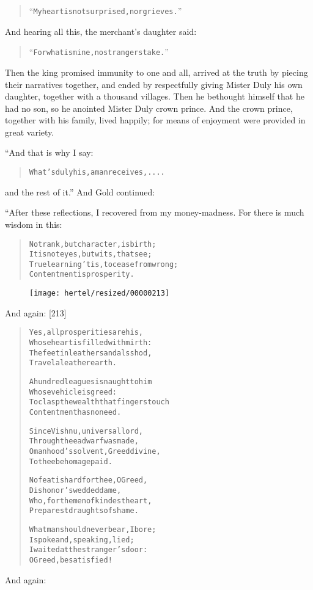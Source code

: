 \documentclass[article, twoside, 10pt]{memoir}
\renewenvironment{verbatim}{%
\begin{quote}%
\vskip -10pt%
\begin{alltt}\normalfont\small}{\end{alltt}%
\end{quote}%
\vskip -10pt
} %
\begin{document}
\begin{verbatim}
“My heart is not surprised, nor grieves.”
\end{verbatim}
And hearing all this, the merchant's daughter said:

\begin{verbatim}
“For what is mine, no strangers take.”
\end{verbatim}
Then the king promised immunity to one and all, arrived at the
truth by piecing their narratives together, and ended by
respectfully giving Mister Duly his own daughter, together with a
thousand villages. Then he bethought himself that he had no son, so
he anointed Mister Duly crown prince. And the crown prince,
together with his family, lived happily; for means of enjoyment
were provided in great variety.

“And that is why I say:

\begin{verbatim}
What's duly his, a man receives, ....
\end{verbatim}
and the rest of it.” And Gold continued:

“After these reflections, I recovered from my money-madness. For
there is much wisdom in this:

\begin{verbatim}
Not rank, but character, is birth;
    It is not eyes, but wits, that see;
True learning 'tis, to cease from wrong;
    Contentment is prosperity.
\end{verbatim}
\begin{figure}[p]\texttt{[image: hertel/resized/00000213]}\end{figure}And again: [213]

\begin{verbatim}
Yes, all prosperities are his,
    Whose heart is filled with mirth:
The feet in leather sandals shod,
    Travel a leather earth.

A hundred leagues is naught to him
    Whose vehicle is greed:
To clasp the wealth that fingers touch
    Contentment has no need.

Since Vishnu, universal lord,
    Through thee a dwarf was made,
O manhood's solvent, Greed divine,
    To thee be homage paid.

No feat is hard for thee, O Greed,
    Dishonor's wedded dame,
Who, for the men of kindest heart,
    Preparest draughts of shame.

What man should never bear, I bore;
    I spoke and, speaking, lied;
I waited at the stranger's door:
    O Greed, be satisfied!
\end{verbatim}
And again:
\end{document}
